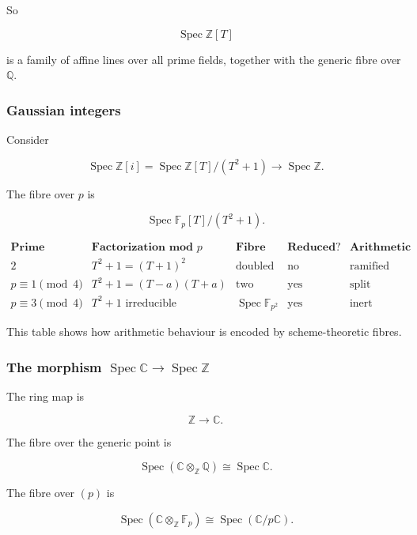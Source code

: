 \documentclass[12pt,a4paper]{article}
\theoremstyle{notespace}
\begin{document}
So

\[
\operatorname{Spec}\mathbb{Z}[T]
\]

is a family of affine lines over all prime fields, together with the generic fibre over \(\mathbb{Q}\).

\subsubsection{Gaussian integers}

Consider

\[
\operatorname{Spec}\mathbb{Z}[i]
=
\operatorname{Spec}\mathbb{Z}[T]/(T^2+1)
\to
\operatorname{Spec}\mathbb{Z}.
\]

The fibre over \(p\) is

\[
\operatorname{Spec}\mathbb{F}_p[T]/(T^2+1).
\]

\[
\begin{array}{c|c|c|c|c}
	\textbf{Prime}
	&
	\textbf{Factorization mod }p
	&
	\textbf{Fibre}
	&
	\textbf{Reduced?}
	&
	\textbf{Arithmetic meaning}
	\\
	\hline
	2
	&
	T^2+1=(T+1)^2
	&
	\text{doubled point}
	&
	\text{no}
	&
	\text{ramified}
	\\
	\hline
	p\equiv 1\pmod 4
	&
	T^2+1=(T-a)(T+a)
	&
	\text{two points}
	&
	\text{yes}
	&
	\text{split}
	\\
	\hline
	p\equiv 3\pmod 4
	&
	T^2+1\text{ irreducible}
	&
	\operatorname{Spec}\mathbb{F}_{p^2}
	&
	\text{yes}
	&
	\text{inert}
\end{array}
\]

This table shows how arithmetic behaviour is encoded by scheme-theoretic fibres.

\subsubsection{The morphism \texorpdfstring{\(\operatorname{Spec}\mathbb{C}\to \operatorname{Spec}\mathbb{Z}\)}{Spec C to Spec Z}}

The ring map is

\[
\mathbb{Z}\to \mathbb{C}.
\]

The fibre over the generic point is

\[
\operatorname{Spec}\left(\mathbb{C}\otimes_{\mathbb{Z}}\mathbb{Q}\right)
\cong
\operatorname{Spec}\mathbb{C}.
\]

The fibre over \((p)\) is

\[
\operatorname{Spec}\left(\mathbb{C}\otimes_{\mathbb{Z}}\mathbb{F}_p\right)
\cong
\operatorname{Spec}(\mathbb{C}/p\mathbb{C}).
\]
\end{document}
